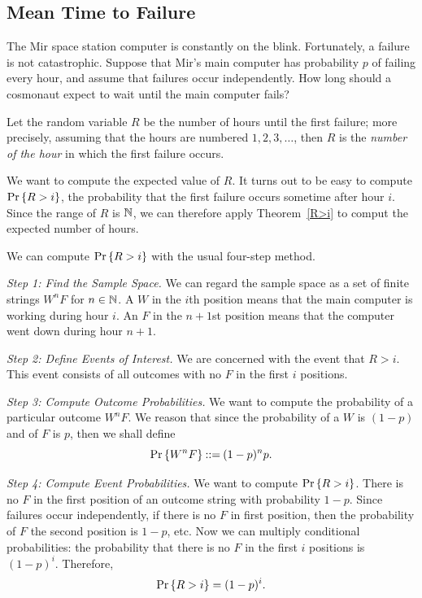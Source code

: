 \documentclass[11pt,twoside]{article}
\begin{document}
\subsection{Mean Time to Failure}

The Mir space station computer is constantly on the blink.  Fortunately, a
failure is not catastrophic.  Suppose that Mir's main computer has
probability $p$ of failing every hour, and assume that failures occur
independently.  How long should a cosmonaut expect to wait until the main
computer fails?

Let the random variable $R$ be the number of hours until the first
failure; more precisely, assuming that the hours are numbered $1, 2, 3,
\ldots$, then $R$ is the \emph{number of the hour} in which the first
failure occurs.

We want to compute the expected value of $R$.  It turns out to be easy to
compute $\mathop{\textup{Pr}}\nolimits\left\{R > i\right\}$, the probability that the first failure occurs
sometime after hour $i$.  Since the range of $R$ is $\mathbb{N}$, we can
therefore apply Theorem~\ref{R>i} to comput the expected number of hours.

We can compute $\mathop{\textup{Pr}}\nolimits\left\{R > i\right\}$ with the usual four-step method.

{\em Step 1: Find the Sample Space.} We can regard the sample space as a
set of finite strings $W^nF$ for $n \in \mathbb{N}$.  A $W$ in the $i$th
position means that the main computer is working during hour $i$.  An $F$
in the $n+1$st position means that the computer went down during hour
$n+1$.

{\em Step 2: Define Events of Interest.} We are concerned with the
event that $R > i$.  This event consists of all outcomes with no $F$
in the first $i$ positions.

{\em Step 3: Compute Outcome Probabilities.} We want to compute the
probability of a particular outcome $W^nF$.  We reason that since the
probability of a $W$ is $(1-p)$ and of $F$ is $p$, then we shall define
\[
\mathop{\textup{Pr}}\nolimits\left\{W^nF\right\} \mathbin{::=} (1-p)^np.
\]

{\em Step 4: Compute Event Probabilities.}  We want to compute $\mathop{\textup{Pr}}\nolimits\left\{R >
i\right\}$.  There is no $F$ in the first position of an outcome string with
probability $1-p$.  Since failures occur independently, if there is no $F$
in first position, then the probability of $F$ the second position is
$1-p$, etc.  Now we can multiply conditional probabilities: the
probability that there is no $F$ in the first $i$ positions is $(1-p)^i$.
Therefore,
\begin{equation}\label{pR>i}
\mathop{\textup{Pr}}\nolimits\left\{R > i\right\} = (1-p)^i.
\end{equation}
\end{document}
